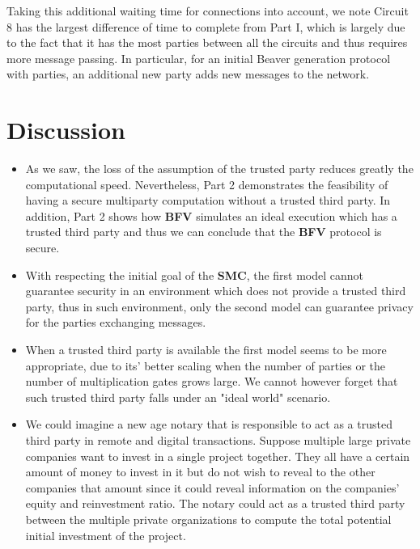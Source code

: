 \documentclass[10pt,conference,compsocconf]{IEEEtran}
\begin{document}
Taking this additional waiting time for connections into account, we note Circuit 8 has the largest difference of time to complete from Part I, which is largely due to the fact that it has the most parties between all the circuits and thus requires more message passing. In particular, for an initial Beaver generation protocol with  parties, an additional new party adds  new messages to the network.

\section{Discussion}
\begin{itemize}
    \item As we saw, the loss of the assumption of the trusted party reduces greatly the computational speed. Nevertheless, Part 2 demonstrates the feasibility of having a secure multiparty computation without a trusted third party. In addition, Part 2 shows how \textbf{BFV} simulates an ideal execution which has a trusted third party and thus we can conclude that the \textbf{BFV} protocol is secure.\\
    \item With respecting the initial goal of the \textbf{SMC}, the first model cannot guarantee security in an environment which does not provide a trusted third party, thus in such environment, only the second model can guarantee privacy for the parties exchanging messages.\\
    \item When a trusted third party is available the first model seems to be more appropriate, due to its' better scaling when the number of parties or the number of multiplication gates grows large. We cannot however forget that such trusted third party falls under an "ideal world" scenario.\\
    \item We could imagine a new age notary that is responsible to act as a trusted third party in remote and digital transactions. Suppose multiple large private companies want to invest in a single project together. They all have a certain amount of money to invest in it but do not wish to reveal to the other companies that amount since it could reveal information on the companies' equity and reinvestment ratio. The notary could act as a trusted third party between the multiple private organizations to compute the total potential initial investment of the project.\\
    

\end{itemize}
\end{document}
